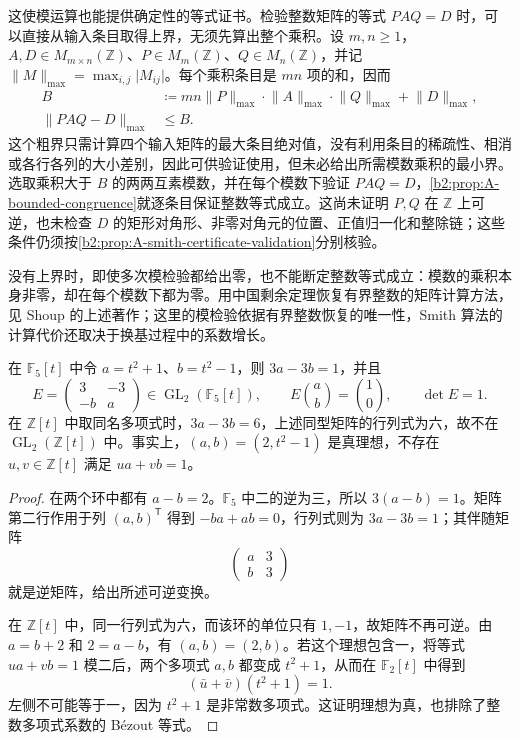 这使模运算也能提供确定性的等式证书。检验整数矩阵的等式 \(PAQ=D\) 时，可以直接从输入条目取得上界，无须先算出整个乘积。设 \(m,n\geq1\)，\(A,D\in M_{m\times n}(\mathbb Z)\)、\(P\in M_m(\mathbb Z)\)、\(Q\in M_n(\mathbb Z)\)，并记 \(\lVert M\rVert_{\max}=\max_{i,j}\lvert M_{ij}\rvert\)。每个乘积条目是 \(mn\) 项的和，因而
\[
	\begin{aligned}
		B&\coloneqq mn\lVert P\rVert_{\max}\cdot\lVert A\rVert_{\max} \cdot\lVert Q\rVert_{\max}+\lVert D\rVert_{\max},\\
		\lVert PAQ-D\rVert_{\max}&\leq B.
	\end{aligned}
\]
这个粗界只需计算四个输入矩阵的最大条目绝对值，没有利用条目的稀疏性、相消或各行各列的大小差别，因此可供验证使用，但未必给出所需模数乘积的最小界。选取乘积大于 \(B\) 的两两互素模数，并在每个模数下验证 \(PAQ=D\)，\cref{b2:prop:A-bounded-congruence}就逐条目保证整数等式成立。这尚未证明 \(P,Q\) 在 \(\mathbb Z\) 上可逆，也未检查 \(D\) 的矩形对角形、非零对角元的位置、正值归一化和整除链；这些条件仍须按\cref{b2:prop:A-smith-certificate-validation}分别核验。

\ProseParagraphBreak
没有上界时，即使多次模检验都给出零，也不能断定整数等式成立：模数的乘积本身非零，却在每个模数下都为零。用中国剩余定理恢复有界整数的矩阵计算方法，见 Shoup 的上述著作\cite[Section 4.4, pp. 84--86]{Shoup2008NumberTheoryAlgebra}；这里的模检验依据有界整数恢复的唯一性，Smith 算法的计算代价还取决于换基过程中的系数增长。

\begin{proposition}\label{b2:prop:A-bezout-coefficient-ring}
	在 \(\mathbb F_5[t]\) 中令 \(a=t^2+1\)、\(b=t^2-1\)，则 \(3a-3b=1\)，并且
	\[
		E=\begin{pmatrix}3&-3\\-b&a\end{pmatrix}
		\in\operatorname{GL}_2(\mathbb F_5[t]),\qquad E\binom ab=\binom10,\qquad \det E=1.
	\]
	在 \(\mathbb Z[t]\) 中取同名多项式时，\(3a-3b=6\)，上述同型矩阵的行列式为六，故不在 \(\operatorname{GL}_2(\mathbb Z[t])\) 中。事实上，\((a,b)=(2,t^2-1)\) 是真理想，不存在 \(u,v\in\mathbb Z[t]\) 满足 \(ua+vb=1\)。
\end{proposition}
\begin{proof}
	在两个环中都有 \(a-b=2\)。\(\mathbb F_5\) 中二的逆为三，所以 \(3(a-b)=1\)。矩阵第二行作用于列 \((a,b)^{\mathsf T}\) 得到 \(-ba+ab=0\)，行列式则为 \(3a-3b=1\)；其伴随矩阵
	\[
		\begin{pmatrix}a&3\\b&3\end{pmatrix}
	\]
	就是逆矩阵，给出所述可逆变换。

	在 \(\mathbb Z[t]\) 中，同一行列式为六，而该环的单位只有 \(1,-1\)，故矩阵不再可逆。由 \(a=b+2\) 和 \(2=a-b\)，有 \((a,b)=(2,b)\)。若这个理想包含一，将等式 \(ua+vb=1\) 模二后，两个多项式 \(a,b\) 都变成 \(t^2+1\)，从而在 \(\mathbb F_2[t]\) 中得到
	\[
		(\bar u+\bar v)(t^2+1)=1.
	\]
	左侧不可能等于一，因为 \(t^2+1\) 是非常数多项式。这证明理想为真，也排除了整数多项式系数的 Bézout 等式。
\end{proof}

